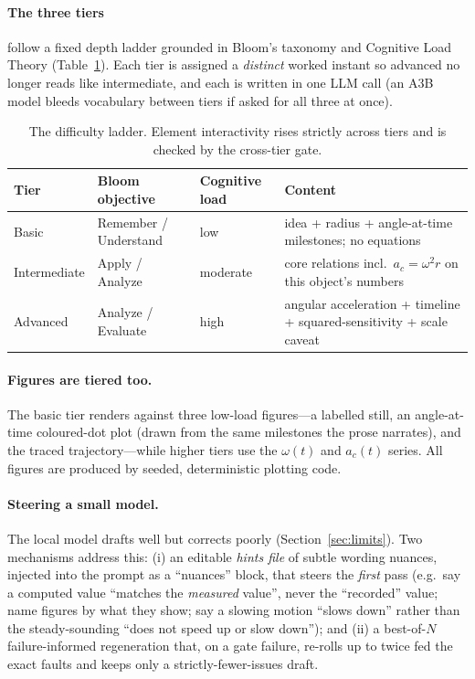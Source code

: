 \documentclass[11pt]{article}
\begin{document}
\paragraph{The three tiers} follow a fixed depth ladder grounded in Bloom's
taxonomy and Cognitive Load Theory (Table~\ref{tab:tiers}). Each tier is
assigned a \emph{distinct} worked instant so advanced no longer reads like
intermediate, and each is written in one LLM call (an A3B model bleeds
vocabulary between tiers if asked for all three at once).

\begin{table}[t]
  \centering
  \small
  \begin{tabular}{@{}llll@{}}
    \toprule
    Tier & Bloom objective & Cognitive load & Content \\
    \midrule
    Basic        & Remember / Understand & low      & idea + radius + angle-at-time milestones; no equations \\
    Intermediate & Apply / Analyze       & moderate & core relations incl.\ $a_c=\omega^2 r$ on this object's numbers \\
    Advanced     & Analyze / Evaluate    & high     & angular acceleration + timeline + squared-sensitivity + scale caveat \\
    \bottomrule
  \end{tabular}
  \caption{The difficulty ladder. Element interactivity rises strictly across
  tiers and is checked by the cross-tier gate.}
  \label{tab:tiers}
\end{table}

\paragraph{Figures are tiered too.} The basic tier renders against three
low-load figures---a labelled still, an angle-at-time coloured-dot plot
(drawn from the same milestones the prose narrates), and the traced
trajectory---while higher tiers use the $\omega(t)$ and $a_c(t)$ series. All
figures are produced by seeded, deterministic plotting code.

\paragraph{Steering a small model.} The local model drafts well but corrects
poorly (Section~\ref{sec:limits}). Two mechanisms address this: (i) an
editable \emph{hints file} of subtle wording nuances, injected into the prompt
as a ``nuances'' block, that steers the \emph{first} pass (e.g.\ say a computed
value ``matches the \emph{measured} value'', never the ``recorded'' value; name
figures by what they show; say a slowing motion ``slows down'' rather than the
steady-sounding ``does not speed up or slow down''); and (ii) a best-of-$N$
failure-informed regeneration that, on a gate failure, re-rolls up to twice fed
the exact faults and keeps only a strictly-fewer-issues draft.
\end{document}
